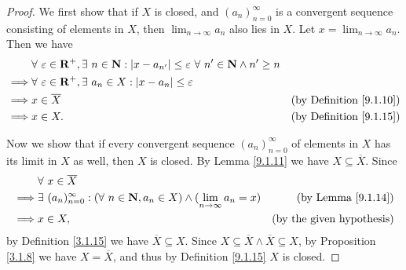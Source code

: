 \begin{proof}
    We first show that if \(X\) is closed, and \((a_n)_{n = 0}^\infty\) is a convergent sequence consisting of elements in \(X\), then \(\lim_{n \to \infty} a_n\) also lies in \(X\).
    Let \(x = \lim_{n \to \infty} a_n\).
    Then we have
    \begin{align*}
                 & \forall\ \varepsilon \in \mathbf{R}^+, \exists\ n \in \mathbf{N} : \abs*{x - a_{n'}} \leq \varepsilon \ \forall\ n' \in \mathbf{N} \land n' \geq n                                       \\
        \implies & \forall\ \varepsilon \in \mathbf{R}^+, \exists\ a_n \in X : \abs*{x - a_n} \leq \varepsilon                                                                                              \\
        \implies & x \in \overline{X}                                                                                                                                 & \text{(by Definition \ref{9.1.10})} \\
        \implies & x \in X.                                                                                                                                           & \text{(by Definition \ref{9.1.15})}
    \end{align*}

    Now we show that if every convergent sequence \((a_n)_{n = 0}^\infty\) of elements in \(X\) has its limit in \(X\) as well, then \(X\) is closed.
    By Lemma \ref{9.1.11} we have \(X \subseteq \overline{X}\).
    Since
    \begin{align*}
                 & \forall\ x \in \overline{X}                                                                                                                   \\
        \implies & \exists\ (a_n)_{n = 0}^\infty : (\forall\ n \in \mathbf{N}, a_n \in X) \land (\lim_{n \to \infty} a_n = x) & \text{(by Lemma \ref{9.1.14})}   \\
        \implies & x \in X,                                                                                                   & \text{(by the given hypothesis)}
    \end{align*}
    by Definition \ref{3.1.15} we have \(\overline{X} \subseteq X\).
    Since \(X \subseteq \overline{X} \land \overline{X} \subseteq X\), by Proposition \ref{3.1.8} we have \(X = \overline{X}\), and thus by Definition \ref{9.1.15} \(X\) is closed.
\end{proof}

